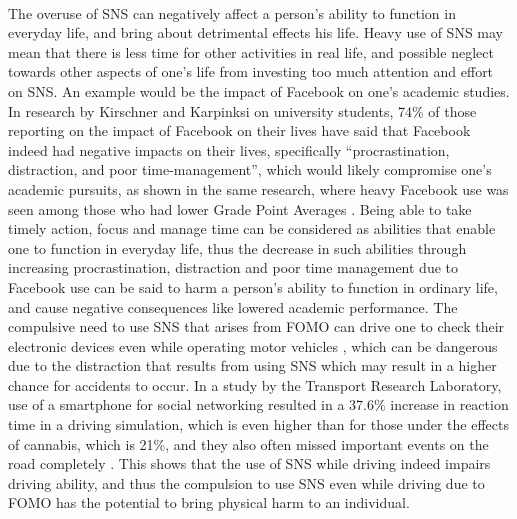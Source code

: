     \paragraph{}
      The overuse of SNS can negatively affect a person’s ability to function in everyday life, and bring about detrimental effects his life. Heavy use of SNS may mean that there is less time for other activities in real life, and possible neglect towards other aspects of one’s life from investing too much attention and effort on SNS. An example would be the impact of Facebook on one’s academic studies. In research by Kirschner and Karpinksi on university students, 74\% of those reporting on the impact of Facebook on their lives have said that Facebook indeed had negative impacts on their lives, specifically “procrastination, distraction, and poor time-management”, which would likely compromise one’s academic pursuits, as shown in the same research, where heavy Facebook use was seen among those who had lower Grade Point Averages \cite{kirschner2010facebook}. Being able to take timely action, focus and manage time can be considered as abilities that enable one to function in everyday life, thus the decrease in such abilities through increasing procrastination, distraction and poor time management due to Facebook use can be said to harm a person’s ability to function in ordinary life, and cause negative consequences like lowered academic performance. The compulsive need to use SNS that arises from FOMO can drive one to check their electronic devices even while operating motor vehicles \cite{przybylski2013motivational}, which can be dangerous due to the distraction that results from using SNS which may result in a higher chance for accidents to occur. In a study by the Transport Research Laboratory, use of a smartphone for social networking resulted in a 37.6\% increase in reaction time in a driving simulation, which is even higher than for those under the effects of cannabis, which is 21\%, and they also often missed important events on the road completely \cite{trl2012dont}. This shows that the use of SNS while driving indeed impairs driving ability, and thus the compulsion to use SNS even while driving due to FOMO has the potential to bring physical harm to an individual.
